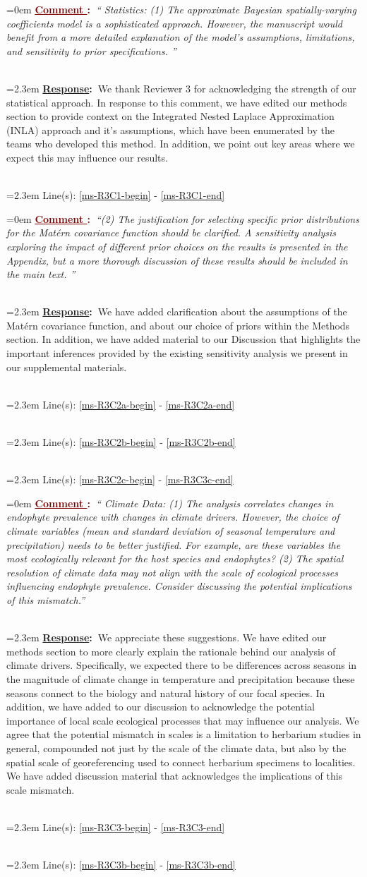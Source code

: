 \documentclass[12pt]{article}
\newcounter{cN}
\newcommand{\comment}[1]{
	\vspace{2em}
	\refstepcounter{cN} %
	\noindent \hangindent=0em \textbf{\textcolor{Maroon}{\uline{Comment \thecN}:~}}\emph{``#1''}
	}
\newcommand{\response}[1]{
	\\[0.25em]
	\hangindent=2.3em \textbf{\textcolor{NavyBlue}{\uline{Response}:~}}#1
	}
\newcommand{\linesref}[2]{
		\\[0.25em]
	\hangindent=2.3em {\color{Mahogany} Line(s): \ref{#1} - \ref{#2}}
}
\begin{document}
\comment{ Statistics: (1) The approximate Bayesian spatially-varying coefficients model is a sophisticated approach. However, the manuscript would benefit from a more detailed explanation of the model's assumptions, limitations, and sensitivity to prior specifications. }
	\response{We thank Reviewer 3 for acknowledging the strength of our statistical approach. 
		In response to this comment, we have edited our methods section to provide context on the Integrated Nested Laplace Approximation (INLA) approach and it's assumptions, which have been enumerated by the teams who developed this method. In addition, we point out key areas where we expect this may influence our results.}
	\linesref{ms-R3C1-begin}{ms-R3C1-end}
	
	
\comment{(2) The justification for selecting specific prior distributions for the Matérn covariance function should be clarified. A sensitivity analysis exploring the impact of different prior choices on the results is presented in the Appendix, but a more thorough discussion of these results should be included in the main text. }
	\response{We have added clarification about the assumptions of the Matérn covariance function, and about our choice of priors within the Methods section. In addition, we have added material to our Discussion that highlights the important inferences provided by the existing sensitivity analysis we present in our supplemental materials.}
	\linesref{ms-R3C2a-begin}{ms-R3C2a-end}
	\linesref{ms-R3C2b-begin}{ms-R3C2b-end}
\linesref{ms-R3C2c-begin}{ms-R3C3c-end}


\comment{  Climate Data: (1) The analysis correlates changes in endophyte prevalence with changes in climate drivers. However, the choice of climate variables (mean and standard deviation of seasonal temperature and precipitation) needs to be better justified. For example, are these variables the most ecologically relevant for the host species and endophytes? (2) The spatial resolution of climate data may not align with the scale of ecological processes influencing endophyte prevalence. Consider discussing the potential implications of this mismatch.}
\response{We appreciate these suggestions. We have edited our methods section to more clearly explain the rationale behind our analysis of climate drivers. Specifically, we expected there to be differences across seasons in the magnitude of climate change in temperature and precipitation because these seasons connect to the biology and natural history of our focal species. In addition, we have added to our discussion to acknowledge the potential importance of local scale ecological processes that may influence our analysis. We agree that the potential mismatch in scales is a limitation to herbarium studies in general, compounded not just by the scale of the climate data, but also by the spatial scale of georeferencing used to connect herbarium specimens to localities. We have added discussion material that acknowledges the implications of this scale mismatch.}
\linesref{ms-R3C3-begin}{ms-R3C3-end}
\linesref{ms-R3C3b-begin}{ms-R3C3b-end}
\end{document}
